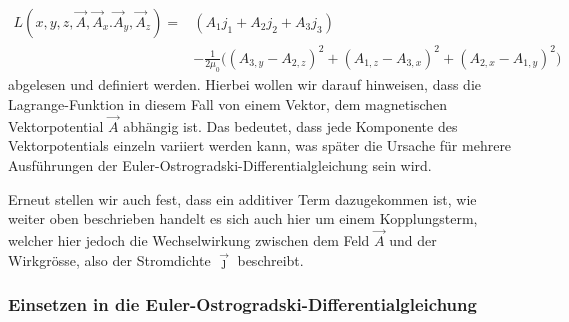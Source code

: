 	\begin{align}
	\label{maxwell:magnetostatikLagrange}
	L\left(x,y,z, \vec{A}, \vec{A}_x. \vec{A}_y, \vec{A}_z\right)
	=&\left( A_1j_1 + A_2j_2 + A_3j_3\right) \\ \nonumber
	 &- \frac{1}{2\mu_0}\bigl( 
	( A_{3,y} - A_{2,z})^2 
	+ (A_{1,z} -A_{3,x})^2
	+ (A_{2,x} -A_{1,y})^2   
	\bigr)
	\end{align}
abgelesen und definiert werden. 
Hierbei wollen wir darauf hinweisen, dass die Lagrange-Funktion in diesem Fall von einem Vektor, dem magnetischen Vektorpotential $\vec{A}$ abhängig ist. 
Das bedeutet, dass jede Komponente des Vektorpotentials einzeln variiert werden kann, was später die Ursache für mehrere Ausführungen der Euler-Ostrogradski-Differentialgleichung sein wird.

Erneut stellen wir auch fest, dass ein additiver Term dazugekommen ist, wie weiter oben beschrieben handelt es sich auch hier um einem Kopplungsterm, welcher hier jedoch die Wechselwirkung zwischen dem Feld $\vec{A}$ und der Wirkgrösse, also der Stromdichte $\vec{\jmath}$ beschreibt.

\subsubsection{Einsetzen in die Euler-Ostrogradski-Differentialgleichung}

